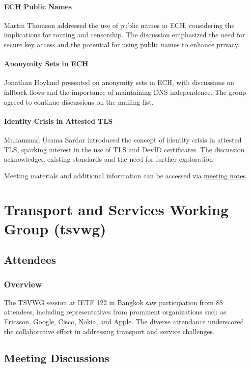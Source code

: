 \documentclass{article}
\begin{document}
\paragraph{ECH Public Names}
Martin Thomson addressed the use of public names in ECH, considering the implications for routing and censorship. The discussion emphasized the need for secure key access and the potential for using public names to enhance privacy.

\paragraph{Anonymity Sets in ECH}
Jonathan Hoyland presented on anonymity sets in ECH, with discussions on fallback flows and the importance of maintaining DNS independence. The group agreed to continue discussions on the mailing list.

\paragraph{Identity Crisis in Attested TLS}
Muhammad Usama Sardar introduced the concept of identity crisis in attested TLS, sparking interest in the use of TLS and DevID certificates. The discussion acknowledged existing standards and the need for further exploration.

Meeting materials and additional information can be accessed via \href{https://notes.ietf.org/notes-ietf-122-tls}{meeting notes}.




\newpage

\section{Transport and Services Working Group (tsvwg)}

\subsection{Attendees}
\subsubsection{Overview}
The TSVWG session at IETF 122 in Bangkok saw participation from 88 attendees, including representatives from prominent organizations such as Ericsson, Google, Cisco, Nokia, and Apple. The diverse attendance underscored the collaborative effort in addressing transport and service challenges.

\subsection{Meeting Discussions}
\end{document}
